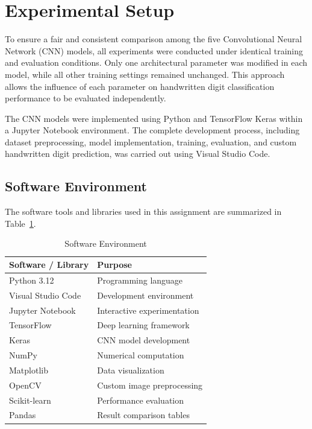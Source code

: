 
\section{Experimental Setup}

To ensure a fair and consistent comparison among the five Convolutional Neural Network (CNN) models, all experiments were conducted under identical training and evaluation conditions. Only one architectural parameter was modified in each model, while all other training settings remained unchanged. This approach allows the influence of each parameter on handwritten digit classification performance to be evaluated independently.

The CNN models were implemented using Python and TensorFlow Keras within a Jupyter Notebook environment. The complete development process, including dataset preprocessing, model implementation, training, evaluation, and custom handwritten digit prediction, was carried out using Visual Studio Code.

\subsection{Software Environment}

The software tools and libraries used in this assignment are summarized in Table~\ref{tab:software_environment}.

\begin{table}[H]
\centering
\caption{Software Environment}\label{tab:software_environment}

\begin{tabular}{ll}
\toprule
\textbf{Software / Library} & \textbf{Purpose} \\
\midrule
Python 3.12 & Programming language \\
Visual Studio Code & Development environment \\
Jupyter Notebook & Interactive experimentation \\
TensorFlow & Deep learning framework \\
Keras & CNN model development \\
NumPy & Numerical computation \\
Matplotlib & Data visualization \\
OpenCV & Custom image preprocessing \\
Scikit-learn & Performance evaluation \\
Pandas & Result comparison tables \\
\bottomrule
\end{tabular}

\end{table}

